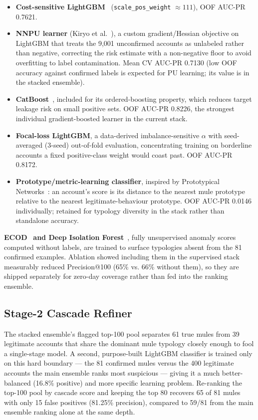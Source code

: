 \documentclass{article}
\begin{document}
\begin{itemize}
\item \textbf{Cost-sensitive LightGBM}~\cite{lightgbm2017} (\texttt{scale\_pos\_weight}
$\approx 111$), OOF AUC-PR 0.7621.
\item \textbf{NNPU learner} (Kiryo et al.~\cite{kiryo2017}), a custom gradient/Hessian
objective on LightGBM that treats the 9{,}001 unconfirmed accounts as unlabeled rather
than negative, correcting the risk estimate with a non-negative floor to avoid
overfitting to label contamination. Mean CV AUC-PR 0.7130 (low OOF accuracy against
confirmed labels is expected for PU learning; its value is in the stacked ensemble).
\item \textbf{CatBoost}~\cite{catboost2018}, included for its ordered-boosting property,
which reduces target leakage risk on small positive sets. OOF AUC-PR 0.8226, the
strongest individual gradient-boosted learner in the current stack.
\item \textbf{Focal-loss LightGBM}, a data-derived imbalance-sensitive $\alpha$ with
seed-averaged (3-seed) out-of-fold evaluation, concentrating training on borderline
accounts a fixed positive-class weight would coast past. OOF AUC-PR 0.8172.
\item \textbf{Prototype/metric-learning classifier}, inspired by Prototypical
Networks~\cite{snell2017}: an account's score is its distance to the nearest mule
prototype relative to the nearest legitimate-behaviour prototype. OOF AUC-PR 0.0146
individually; retained for typology diversity in the stack rather than standalone
accuracy.
\end{itemize}

\textbf{ECOD}~\cite{ecod2022} \textbf{and Deep Isolation Forest}~\cite{deepif2023},
fully unsupervised anomaly scores computed without labels, are trained to surface
typologies absent from the 81 confirmed examples. Ablation showed including them in the
supervised stack measurably reduced Precision@100 (65\% vs. 66\% without them), so they
are shipped separately for zero-day coverage rather than fed into the ranking ensemble.

\subsection{Stage-2 Cascade Refiner}
\label{ssec:cascade}

The stacked ensemble's flagged top-100 pool separates 61 true mules from 39 legitimate
accounts that share the dominant mule typology closely enough to fool a single-stage
model. A second, purpose-built LightGBM classifier is trained only on this hard
boundary --- the 81 confirmed mules versus the 400 legitimate accounts the main ensemble
ranks most suspicious --- giving it a much better-balanced (16.8\% positive) and more
specific learning problem. Re-ranking the top-100 pool by cascade score and keeping the
top 80 recovers 65 of 81 mules with only 15 false positives (81.25\% precision),
compared to 59/81 from the main ensemble ranking alone at the same depth.
\end{document}
